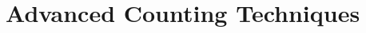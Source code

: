 \documentclass[../discrete.tex]{subfiles}
\begin{document}
\chapter{Advanced Counting Techniques}
\end{document}

